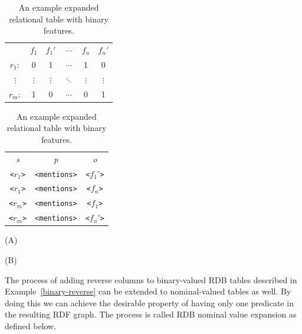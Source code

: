 \begin{table}[ht]
\begin{minipage}[b]{0.4\linewidth}\begin{flushright}
\begin{tabular}{ c | c | c | c | c | c |}
\cline{2-6}
	~   & $f_1$	 &  $f_1'$  & $\cdots$  & $f_n$  &  $f_n'$ \\
\cline{2-6}
$r_1:$	&  0  &  1	& $\cdots$   &    1  & 0\\
\cline{2-6}
$\vdots$& $\vdots$ & $\vdots$  & $\ddots$  & $\vdots$ & $\vdots$\\
\cline{2-6}
$r_m:$	&  1  &  0	& $\cdots$   &    0  & 1\\
\cline{2-6}
\end{tabular}
\end{flushright}
\end{minipage}
\hfill
\begin{minipage}[b]{0.4\linewidth}
\begin{tabular}{c c c}
\emph{s}&   \emph{p}&  \emph{o}\\
\texttt{<$r_1$>}   &    \texttt{<mentions>}   &  \texttt{<$f_1'$>}\\
\texttt{<$r_1$>}   &    \texttt{<mentions>}   &  \texttt{<$f_n$>}\\
\texttt{<$r_m$>}   &    \texttt{<mentions>}   &  \texttt{<$f_1$>}\\
\texttt{<$r_m$>}   &    \texttt{<mentions>}   &  \texttt{<$f_n'$>}\\
\end{tabular}
\end{minipage}
\hspace{1.5cm}
\begin{minipage}[c]{0.4\linewidth}\centering
\vspace{0.2cm}\hspace{2.8cm}(A)
\end{minipage}
\begin{minipage}[c]{0.4\linewidth}\centering
\vspace{0.2cm}\hspace{3.5cm}(B)
\end{minipage}
\caption{\label{tbl:binary-rel-expansion} An example expanded relational table with binary features.}
\end{table}

The process of adding reverse columns to binary-valued RDB tables described in Example~\ref{binary-reverse} can be extended to nominal-valued tables as well. By doing this we can achieve the desirable property of having only one predicate in the resulting RDF graph. The process is called RDB nominal value expansion as defined below.

